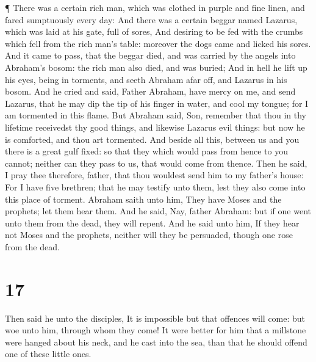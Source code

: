  ¶ There was a certain rich man, which was clothed in
purple and fine linen, and fared sumptuously every day: 
And there was a certain beggar named Lazarus, which was laid at his
gate, full of sores,  And desiring to be fed with the
crumbs which fell from the rich man's table: moreover the dogs came and
licked his sores.  And it came to pass, that the beggar
died, and was carried by the angels into Abraham's bosom: the rich man
also died, and was buried;  And in hell he lift up his
eyes, being in torments, and seeth Abraham afar off, and Lazarus in his
bosom.  And he cried and said, Father Abraham, have mercy
on me, and send Lazarus, that he may dip the tip of his finger in water,
and cool my tongue; for I am tormented in this flame.  But
Abraham said, Son, remember that thou in thy lifetime receivedst thy
good things, and likewise Lazarus evil things: but now he is comforted,
and thou art tormented.  And beside all this, between us
and you there is a great gulf fixed: so that they which would pass from
hence to you cannot; neither can they pass to us, that would come from
thence.  Then he said, I pray thee therefore, father, that
thou wouldest send him to my father's house:  For I have
five brethren; that he may testify unto them, lest they also come into
this place of torment.  Abraham saith unto him, They have
Moses and the prophets; let them hear them.  And he said,
Nay, father Abraham: but if one went unto them from the dead, they will
repent.  And he said unto him, If they hear not Moses and
the prophets, neither will they be persuaded, though one rose from the
dead.

\hypertarget{section-16}{%
\section{17}\label{section-16}}

 Then said he unto the disciples, It is impossible but that
offences will come: but woe unto him, through whom they come!
 It were better for him that a millstone were hanged about
his neck, and he cast into the sea, than that he should offend one of
these little ones.

